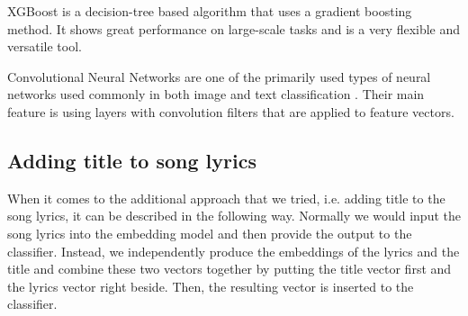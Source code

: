 XGBoost \cite{xgboostRef} is a decision-tree based algorithm that uses a gradient boosting method. It shows great performance on large-scale tasks and is a very flexible and versatile tool.

Convolutional Neural Networks are one of the primarily used types of neural networks used commonly in both image and text classification \cite{cnnRef}. Their main feature is using layers with convolution filters that are applied to feature vectors.

\subsection{Adding title to song lyrics}
When it comes to the additional approach that we tried, i.e. adding title to the song lyrics, it can be described in the following way. Normally we would input the song lyrics into the embedding model and then provide the output to the classifier. Instead, we independently produce the embeddings of the lyrics and the title and combine these two vectors together by putting the title vector first and the lyrics vector right beside. Then, the resulting vector is inserted to the classifier.

